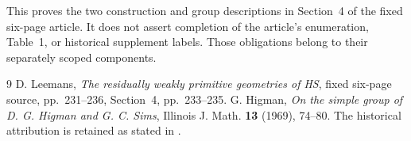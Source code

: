 \documentclass[11pt]{article}
\begin{document}
This proves the two construction and group descriptions in Section~4
of the fixed six-page article.  It does not assert completion of the
article's enumeration, Table~1, or historical supplement labels.
Those obligations belong to their separately scoped components.

\begin{thebibliography}{9}
 D. Leemans, \emph{The residually weakly primitive geometries
of HS}, fixed six-page source, pp.~231--236, Section~4, pp.~233--235.
 G. Higman, \emph{On the simple group of D. G. Higman and
G. C. Sims}, Illinois J. Math. \textbf{13} (1969), 74--80.
The historical attribution is retained as stated in \cite{L}.
\end{thebibliography}
\end{document}
